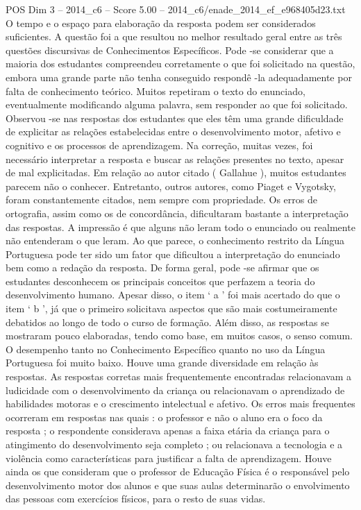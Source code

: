 \begin{textsample}{POS Dim 3 – 2014\_c6 – Score 5.00 – 2014\_c6/enade\_2014\_ef\_e968405d23.txt}
O tempo e o espaço para elaboração da resposta podem ser considerados suficientes.
A questão foi a que resultou no melhor resultado geral entre as três questões discursivas de Conhecimentos Específicos.
Pode -se considerar que a maioria dos estudantes compreendeu corretamente o que foi solicitado na questão, embora uma grande parte não tenha conseguido respondê -la adequadamente por falta de conhecimento teórico.
Muitos repetiram o texto do enunciado, eventualmente modificando alguma palavra, sem responder ao que foi solicitado.
Observou -se nas respostas dos estudantes que eles têm uma grande dificuldade de explicitar as relações estabelecidas entre o desenvolvimento motor, afetivo e cognitivo e os processos de aprendizagem.
Na correção, muitas vezes, foi necessário interpretar a resposta e buscar as relações presentes no texto, apesar de mal explicitadas.
Em relação ao autor citado ( Gallahue ), muitos estudantes parecem não o conhecer.
Entretanto, outros autores, como Piaget e Vygotsky, foram constantemente citados, nem sempre com propriedade.
Os erros de ortografia, assim como os de concordância, dificultaram bastante a interpretação das respostas.
A impressão é que alguns não leram todo o enunciado ou realmente não entenderam o que leram.
Ao que parece, o conhecimento restrito da Língua Portuguesa pode ter sido um fator que dificultou a interpretação do enunciado bem como a redação da resposta.
De forma geral, pode -se afirmar que os estudantes desconhecem os principais conceitos que perfazem a teoria do desenvolvimento humano.
Apesar disso, o item ‘ a ’ foi mais acertado do que o item ‘ b ’, já que o primeiro solicitava aspectos que são mais costumeiramente debatidos ao longo de todo o curso de formação.
Além disso, as respostas se mostraram pouco elaboradas, tendo como base, em muitos casos, o senso comum.
O desempenho tanto no Conhecimento Específico quanto no uso da Língua Portuguesa foi muito baixo.
Houve uma grande diversidade em relação às respostas.
As respostas corretas mais frequentemente encontradas relacionavam a ludicidade com o desenvolvimento da criança ou relacionavam o aprendizado de habilidades motoras e o crescimento intelectual e afetivo.
Os erros mais frequentes ocorreram em respostas nas quais : o professor e não o aluno era o foco da resposta ; o respondente considerava apenas a faixa etária da criança para o atingimento do desenvolvimento seja completo ; ou relacionava a tecnologia e a violência como características para justificar a falta de aprendizagem.
Houve ainda os que consideram que o professor de Educação Física é o responsável pelo desenvolvimento motor dos alunos e que suas aulas determinarão o envolvimento das pessoas com exercícios físicos, para o resto de suas vidas.

\end{textsample}
